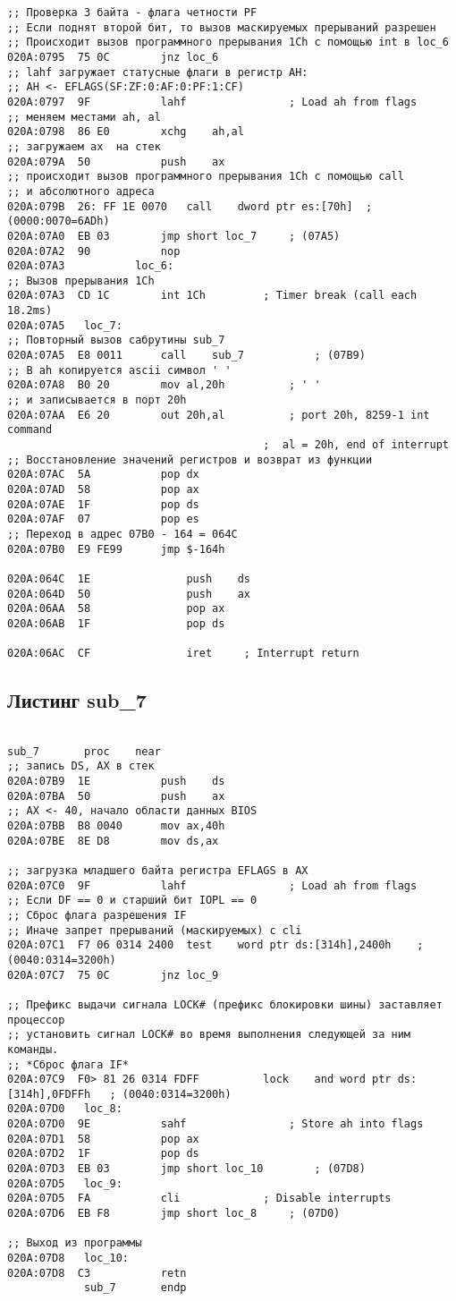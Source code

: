 \begin{lstlisting}[style={asm}]
;; Проверка 3 байта - флага четности PF
;; Если поднят второй бит, то вызов маскируемых прерываний разрешен
;; Происходит вызов программного прерывания 1Ch с помощью int в loc_6
020A:0795  75 0C		jnz	loc_6		
;; lahf загружает статусные флаги в регистр AH: 
;; AH <- EFLAGS(SF:ZF:0:AF:0:PF:1:CF)
020A:0797  9F			lahf				; Load ah from flags
;; меняем местами ah, al
020A:0798  86 E0		xchg	ah,al
;; загружаем ax  на стек
020A:079A  50			push	ax
;; происходит вызов программного прерывания 1Ch с помощью call 
;; и абсолютного адреса
020A:079B  26: FF 1E 0070	call	dword ptr es:[70h]	; (0000:0070=6ADh)
020A:07A0  EB 03		jmp	short loc_7		; (07A5)
020A:07A2  90			nop
020A:07A3			loc_6:
;; Вызов прерывания 1Ch
020A:07A3  CD 1C		int	1Ch			; Timer break (call each 18.2ms)
020A:07A5	loc_7:
;; Повторный вызов сабрутины sub_7
020A:07A5  E8 0011		call	sub_7			; (07B9)
;; В ah копируется ascii символ ' '
020A:07A8  B0 20		mov	al,20h			; ' '
;; и записывается в порт 20h
020A:07AA  E6 20		out	20h,al			; port 20h, 8259-1 int command
										;  al = 20h, end of interrupt
;; Восстановление значений регистров и возврат из функции
020A:07AC  5A			pop	dx
020A:07AD  58			pop	ax
020A:07AE  1F			pop	ds
020A:07AF  07			pop	es
;; Переход в адрес 07B0 - 164 = 064C
020A:07B0  E9 FE99		jmp	$-164h

020A:064C  1E				push	ds
020A:064D  50				push	ax
020A:06AA  58				pop	ax
020A:06AB  1F				pop	ds

020A:06AC  CF				iret	 ; Interrupt return

\end{lstlisting}

\subsection*{Листинг sub\_7} 
\begin{lstlisting}[style={asm}]
 
sub_7		proc	near
;; запись DS, AX в стек
020A:07B9  1E			push	ds
020A:07BA  50			push	ax
;; AX <- 40, начало области данных BIOS
020A:07BB  B8 0040		mov	ax,40h
020A:07BE  8E D8		mov	ds,ax
	
;; загрузка младшего байта регистра EFLAGS в AX
020A:07C0  9F			lahf				; Load ah from flags
;; Если DF == 0 и старший бит IOPL == 0
;; Сброс флага разрешения IF
;; Иначе запрет прерываний (маскируемых) с cli
020A:07C1  F7 06 0314 2400	test	word ptr ds:[314h],2400h	; (0040:0314=3200h)
020A:07C7  75 0C		jnz	loc_9		
	
;; Префикс выдачи сигнала LOCK# (префикс блокировки шины) заставляет процессор 
;; установить сигнал LOCK# во время выполнения следующей за ним команды. 
;; *Сброс флага IF*
020A:07C9  F0> 81 26 0314 FDFF          lock	and	word ptr ds:[314h],0FDFFh	; (0040:0314=3200h)
020A:07D0	loc_8:
020A:07D0  9E			sahf				; Store ah into flags
020A:07D1  58			pop	ax
020A:07D2  1F			pop	ds
020A:07D3  EB 03		jmp	short loc_10		; (07D8)
020A:07D5	loc_9:
020A:07D5  FA			cli				; Disable interrupts
020A:07D6  EB F8		jmp	short loc_8		; (07D0)

;; Выход из программы
020A:07D8	loc_10:
020A:07D8  C3			retn
			sub_7		endp
\end{lstlisting}

